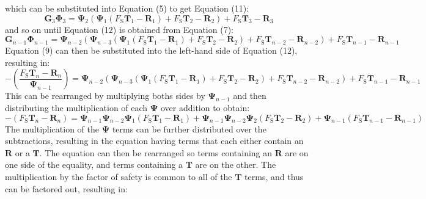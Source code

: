 \documentclass[12pt]{article}
\begin{document}
which can be substituted into Equation (5) to get Equation (11):
\begin{displaymath}
{\mathbf{G}}_{3} {\mathbf{Φ}}_{3}={\mathbf{Ψ}}_{2} \left({\mathbf{Ψ}}_{1} \left({F_{\text{S}}} {\mathbf{T}}_{1}-{\mathbf{R}}_{1}\right)+{F_{\text{S}}} {\mathbf{T}}_{2}-{\mathbf{R}}_{2}\right)+{F_{\text{S}}} {\mathbf{T}}_{3}-{\mathbf{R}}_{3}
\end{displaymath}
and so on until Equation (12) is obtained from Equation (7):
\begin{displaymath}
{\mathbf{G}}_{n-1} {\mathbf{Φ}}_{n-1}={\mathbf{Ψ}}_{n-2} \left({\mathbf{Ψ}}_{n-3} \left({\mathbf{Ψ}}_{1} \left({F_{\text{S}}} {\mathbf{T}}_{1}-{\mathbf{R}}_{1}\right)+{F_{\text{S}}} {\mathbf{T}}_{2}-{\mathbf{R}}_{2}\right)+{F_{\text{S}}} {\mathbf{T}}_{n-2}-{\mathbf{R}}_{n-2}\right)+{F_{\text{S}}} {\mathbf{T}}_{n-1}-{\mathbf{R}}_{n-1}
\end{displaymath}
Equation (9) can then be substituted into the left-hand side of Equation (12), resulting in:
\begin{displaymath}
-\left(\frac{{F_{\text{S}}} {\mathbf{T}}_{n}-{\mathbf{R}}_{n}}{{\mathbf{Ψ}}_{n-1}}\right)={\mathbf{Ψ}}_{n-2} \left({\mathbf{Ψ}}_{n-3} \left({\mathbf{Ψ}}_{1} \left({F_{\text{S}}} {\mathbf{T}}_{1}-{\mathbf{R}}_{1}\right)+{F_{\text{S}}} {\mathbf{T}}_{2}-{\mathbf{R}}_{2}\right)+{F_{\text{S}}} {\mathbf{T}}_{n-2}-{\mathbf{R}}_{n-2}\right)+{F_{\text{S}}} {\mathbf{T}}_{n-1}-{\mathbf{R}}_{n-1}
\end{displaymath}
This can be rearranged by multiplying boths sides by ${\mathbf{Ψ}}_{n-1}$ and then distributing the multiplication of each $\mathbf{Ψ}$ over addition to obtain:
\begin{displaymath}
-\left({F_{\text{S}}} {\mathbf{T}}_{n}-{\mathbf{R}}_{n}\right)={\mathbf{Ψ}}_{n-1} {\mathbf{Ψ}}_{n-2} {\mathbf{Ψ}}_{1} \left({F_{\text{S}}} {\mathbf{T}}_{1}-{\mathbf{R}}_{1}\right)+{\mathbf{Ψ}}_{n-1} {\mathbf{Ψ}}_{n-2} {\mathbf{Ψ}}_{2} \left({F_{\text{S}}} {\mathbf{T}}_{2}-{\mathbf{R}}_{2}\right)+{\mathbf{Ψ}}_{n-1} \left({F_{\text{S}}} {\mathbf{T}}_{n-1}-{\mathbf{R}}_{n-1}\right)
\end{displaymath}
The multiplication of the $\mathbf{Ψ}$ terms can be further distributed over the subtractions, resulting in the equation having terms that each either contain an $\mathbf{R}$ or a $\mathbf{T}$. The equation can then be rearranged so terms containing an $\mathbf{R}$ are on one side of the equality, and terms containing a $\mathbf{T}$ are on the other. The multiplication by the factor of safety is common to all of the $\mathbf{T}$ terms, and thus can be factored out, resulting in:
\end{document}
